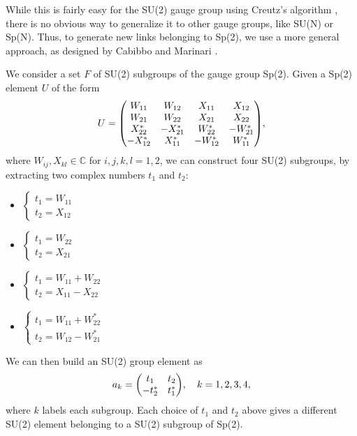 \documentclass[reqno,12pt]{article}
\numberwithin{equation}{section}
\begin{document}
While this is fairly easy for the SU(2) gauge group using Creutz's algorithm \cite{creutz}, there is no obvious
way to generalize it to other gauge groups, like SU(N) or Sp(N). Thus, to generate new links belonging to Sp(2), we use
a more general approach, as designed by Cabibbo and Marinari \cite{cabibbo}.  

We consider a set $F$ of SU(2) subgroups of the gauge group Sp(2). Given a Sp(2) element $U$ of the form
\begin{equation}
	U = \mqty(
		W_{11} & W_{12} & X_{11} & X_{12} \\
		W_{21} & W_{22} & X_{21} & X_{22} \\
		X^*_{22} & -X^*_{21} & W^*_{22} & -W^*_{21} \\
		-X^*_{12} & X^*_{11} & -W^*_{12} & W^*_{11}
	),
\end{equation}
where $W_{ij}, X_{kl} \in \mathbb{C}$ for $i,j,k,l = 1, 2$, 
we can construct four SU(2) subgroups, by extracting two complex numbers $t_1$ and $t_2$:
\begin{itemize}
	\item $\begin{cases} t_1 = W_{11} \\ t_2 = X_{12} \end{cases}$
	\item $\begin{cases} t_1 = W_{22} \\ t_2 = X_{21} \end{cases}$
	\item $\begin{cases} t_1 = W_{11} + W_{22} \\ t_2 = X_{11} - X_{22} \end{cases}$
	\item $\begin{cases} t_1 = W_{11} + W^*_{22} \\ t_2 = W_{12} - W^*_{21} \end{cases}$
\end{itemize}
We can then build an SU(2) group element as
\begin{equation}
	a_k = \mqty(t_1 & t_2 \\ -t_2^* & t_1^*) \qc k = 1, 2, 3, 4,
\end{equation}
where $k$ labels each subgroup. 
Each choice of $t_1$ and $t_2$ above gives a different SU(2) element belonging to a SU(2) subgroup of Sp(2).
\end{document}

